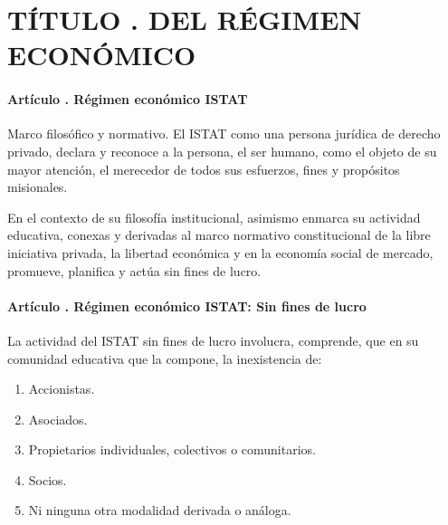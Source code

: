 \part{TÍTULO . DEL RÉGIMEN ECONÓMICO }
\addtocounter{ns}{1}

\subsection{Artículo . Régimen económico ISTAT}
\addtocounter{ns}{1}
Marco filosófico y normativo. El ISTAT como una persona jurídica de derecho privado, declara y reconoce a la persona, el ser humano, como el objeto de su mayor atención, el merecedor de todos sus esfuerzos, fines y propósitos misionales.  

En el contexto de su filosofía institucional, asimismo enmarca su actividad educativa, conexas y derivadas al marco normativo constitucional de la libre iniciativa privada, la libertad económica y en la economía social de mercado, promueve, planifica y actúa sin fines de lucro. 
\subsection{Artículo . Régimen económico ISTAT: Sin fines de lucro}
\addtocounter{ns}{1}
La actividad del ISTAT sin fines de lucro involucra, comprende, que en su comunidad educativa que la compone, la inexistencia de: 
\begin{enumerate}
\item Accionistas. 
\item Asociados. 
\item Propietarios individuales, colectivos o comunitarios. 
\item Socios. 
\item Ni ninguna otra modalidad derivada o análoga.  
\end{enumerate}
